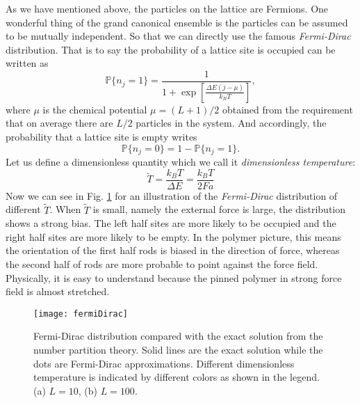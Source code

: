 As we have mentioned above, the particles on the lattice are Fermions. One wonderful thing of the grand canonical ensemble is the particles can be assumed to be mutually independent. So that we can directly use the famous \emph{Fermi-Dirac} distribution. That is to say the probability of a lattice site is occupied can be written as
\begin{equation}
    \label{eq:fermiDirac}
    \mathbb{P}\{n_j=1\} = \frac{1}{1+\exp\left[\frac{\Delta E (j - \mu)}{k_B T}\right]},
\end{equation}
where $\mu$ is the chemical potential $\mu = (L+1)/2$ obtained from the requirement that on average there are $L/2$ particles in the system. And accordingly, the probability that a lattice site is empty writes
\begin{equation}
    \label{eq:probEmpty}
    \mathbb{P}\{n_j=0\} = 1 - \mathbb{P}\{n_j=1\}.
\end{equation}
Let us define a dimensionless quantity which we call it \emph{dimensionless temperature}:
\begin{equation}
    \label{eq:dimensionlessT}
    \tilde{T} = \frac{k_B T }{\Delta E} = \frac{k_B T}{2Fa}
\end{equation}
Now we can see in Fig. \ref{fig:fermiDirac} for an illustration of the \emph{Fermi-Dirac} distribution of different $\tilde{T}$. When $\tilde{T}$ is small, namely the external force is large, the distribution shows a strong bias. The left half sites are more likely to be occupied and the right half sites are more likely to be empty. In the polymer picture, this means the orientation of the first half rods is biased in the direction of force, whereas the second half of rods are more probable to point against the force field. Physically, it is easy to understand because the pinned polymer in strong force field is almost stretched.

\begin{figure}[htpb]
    \centering
    \texttt{[image: fermiDirac]}
    \caption{Fermi-Dirac distribution compared with the exact solution from the number partition theory. Solid lines are the exact solution while the dots are Fermi-Dirac approximations. Different dimensionless temperature is indicated by different colors as shown in the legend. (a) $L=10$, (b) $L=100$. }
    \label{fig:fermiDirac}
\end{figure}

